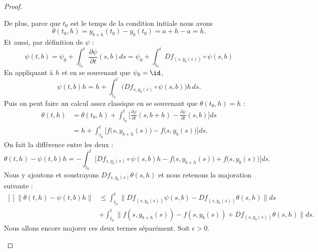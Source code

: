 \begin{proof}
\begin{subproof}
            De plus, parce que \( t_0\) est le temps de la condition initiale nous avons
            \begin{equation}
                \theta(t_0,h)=y_{b+h}(t_0)-y_{b}(t_0)=a+h-a=h.
            \end{equation}
            Et aussi, par définition de \( \psi\) :
            \begin{equation}
                    \psi(t,b)=\psi_0+\int_{t_0}^t\frac{ \partial \psi }{ \partial t }(s,b)ds =\psi_0+\int_{t_0}^tDf_{(s,y_b(s))}\circ\psi(s,b)
            \end{equation}
            En appliquant à \( h\) et en se souvenant que \( \psi_0=\id\),
            \begin{equation}
                    \psi(t,b)h=h+\int_{t_0}^t\Big( Df_{s,y_b(s)}\circ\psi(s,b)\Big)h\,ds.
            \end{equation}
            Puis on peut faire un calcul assez classique en se souvenant que \( \theta(t_0,h)=h\) :
            \begin{subequations}
                \begin{align}
                    \theta(t,h)&=\theta(t_0,h)+\int_{t_0}^t\big[ \frac{ \partial \varphi }{ \partial t }(s,b+h)-\frac{ \partial \varphi }{ \partial t }(s,b) \big]ds\\
                    &=h+\int_{t_0}^t\big[   f\big( s,y_{b+h}(s) \big)-f\big( s,y_b(s) \big)   \big]ds.
                \end{align}
            \end{subequations}
            On fait la différence entre les deux :
            \begin{equation}
                \theta(t,h)-\psi(t,b)h=-\int_{t_0}^t\big[ Df_{s,y_b(s)}\circ\psi(s,b)h-f\big( s,y_{b+h}(s)\big)+f\big( s,y_b(s) \big) \big]ds.
            \end{equation}
            Nous y ajoutons et soustrayons \( Df_{s,y_{b}(s)}\theta(s,h)\) et nous retenons la majoration suivante :
            \begin{equation}        \label{EQooODHPooDYyBoH}
                \begin{aligned}[]
                    \| \theta(t,h)-\psi(t,b)h \|&\leq \int_{t_0}^t\| Df_{(s,y_b(s))}\psi(s,b)-Df_{(s,y_b(s))} \theta(s,h)\| ds\\
                    &+\int_{t_0}^t\| f(s,y_{b+h}(s))-f(s,y_b(s))+Df_{(s,y_b(s))}\theta(s,h)  \|ds.
                \end{aligned}
            \end{equation}
            Nous allons encore majorer ces deux termes séparément. Soit \( \epsilon>0\).


\end{subproof}
\end{proof}
